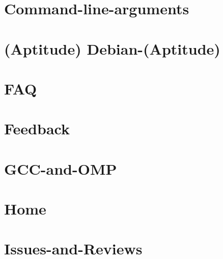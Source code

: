 \documentclass[twoside]{book}
\begin{document}
\chapter{Command-\/line-\/arguments}
\label{md__home_kodemonkey_workspace__t_s_g_l_docs-wiki__command-line-arguments}
\hypertarget{md__home_kodemonkey_workspace__t_s_g_l_docs-wiki__command-line-arguments}{}

\chapter{(Aptitude) Debian-\/(Aptitude)}
\label{md__home_kodemonkey_workspace__t_s_g_l_docs-wiki__debian-}
\hypertarget{md__home_kodemonkey_workspace__t_s_g_l_docs-wiki__debian-}{}

\chapter{F\-A\-Q}
\label{md__home_kodemonkey_workspace__t_s_g_l_docs-wiki__f_a_q}
\hypertarget{md__home_kodemonkey_workspace__t_s_g_l_docs-wiki__f_a_q}{}

\chapter{Feedback}
\label{md__home_kodemonkey_workspace__t_s_g_l_docs-wiki__feedback}
\hypertarget{md__home_kodemonkey_workspace__t_s_g_l_docs-wiki__feedback}{}

\chapter{G\-C\-C-\/and-\/\-O\-M\-P}
\label{md__home_kodemonkey_workspace__t_s_g_l_docs-wiki__g_c_c-and-_o_m_p}
\hypertarget{md__home_kodemonkey_workspace__t_s_g_l_docs-wiki__g_c_c-and-_o_m_p}{}

\chapter{Home}
\label{md__home_kodemonkey_workspace__t_s_g_l_docs-wiki__home}
\hypertarget{md__home_kodemonkey_workspace__t_s_g_l_docs-wiki__home}{}

\chapter{Issues-\/and-\/\-Reviews}
\label{md__home_kodemonkey_workspace__t_s_g_l_docs-wiki__issues-and-_reviews}
\hypertarget{md__home_kodemonkey_workspace__t_s_g_l_docs-wiki__issues-and-_reviews}{}

\end{document}
